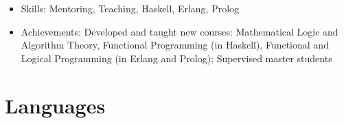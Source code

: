 \documentclass[12pt,a4paper,sans]{moderncv}        %
\begin{document}
\begin{itemize}
  \item Skills: Mentoring, Teaching, Haskell, Erlang, Prolog
  \item Achievements: Developed and taught new courses: Mathematical Logic and Algorithm Theory, Functional Programming (in Haskell), Functional and Logical Programming (in Erlang and Prolog); Supervised master students
\end{itemize}


\section{Languages}


\end{document}
